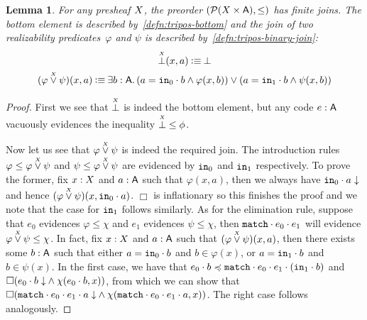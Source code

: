 \documentclass[11pt]{article}
\newtheorem{lemm}[thrm]{Lemma}
\begin{document}
\begin{lemm}\label{lemm:tripos-finite-joins}
  For any presheaf \(X\), the preorder \((\mathcal{P}{({X}\times{\ensuremath{\mathsf{A}}})}, \leq)\) has finite
  joins.
  The bottom element is described by~\ref{defn:tripos-bottom} and the join of two
  realizability predicates~\(\varphi\) and \(\psi\) is described
  by~\ref{defn:tripos-binary-join}:
  \begin{gather}
    \TBot{\X}(x,a)
    \IsDefined
    \IBot
    \label{defn:tripos-bottom}
    \\
    (\TOr{\varphi}{\psi}{\X})(x,a)
    \IsDefined
    \IExists{b:\A}{\IOr%
      {(\IAnd{\IEq{a}{\IAp{\ILeftCode}{b}}}{\varphi(x,b)})}%
      {(\IAnd{\IEq{a}{\IAp{\IRightCode}{b}}}{\psi(x,b)})}
    }
    \label{defn:tripos-binary-join}
  \end{gather}
\end{lemm}
\begin{proof}
  First we see that \(\overset{\scriptscriptstyle X}{\bot}\) is indeed the bottom element, but any code
  \(e : \mathsf{A}\) vacuously evidences the inequality \(\overset{\scriptscriptstyle X}{\bot} \leq \phi\).

  Now let us see that \({\varphi}\overset{\scriptscriptstyle X}{\lor}{\psi}\) is indeed the required join.
  The introduction rules \(\varphi\leq{\varphi}\overset{\scriptscriptstyle X}{\lor}{\psi}\) and
  \(\psi\leq{\varphi}\overset{\scriptscriptstyle X}{\lor}{\psi}\) are evidenced by \(\texttt{in}_0\) and
  \(\texttt{in}_1\) respectively.
  To prove the former, fix \(x:X\) and \(a:\mathsf{A}\) such that \(\varphi(x,a)\),
  then we always have \({{\texttt{in}_0}\cdot{a}}\downarrow\) and hence
  \(({\varphi}\overset{\scriptscriptstyle X}{\lor}{\psi})(x,{\texttt{in}_0}\cdot{a})\).
  \(\Box\) is inflationary so this finishes the proof and we note that the case
  for \(\texttt{in}_1\) follows similarly.
  As for the elimination rule, suppose that \(e_{0}\) evidences
  \(\varphi \leq \chi\) and \(e_{1}\) evidences \(\psi \leq \chi\), then
  \({{\texttt{match}}\cdot{e_{0}}}\cdot{e_{1}}\) will evidence
  \({\varphi}\overset{\scriptscriptstyle X}{\lor}{\psi} \leq \chi\).
  In fact, fix \(x:X\) and \(a:\mathsf{A}\) such that
  \(({\varphi}\overset{\scriptscriptstyle X}{\lor}{\psi})(x,a)\), then there exists some \(b:\mathsf{A}\) such that
  either \({a}={{\texttt{in}_0}\cdot{b}}\) and \(b\in\varphi(x)\), or
  \({a}={{\texttt{in}_1}\cdot{b}}\) and \(b\in\psi(x)\).
  In the first case, we have that
  \(\IPLeq%
  {\IAp{e_{0}}{b}}%
  {\IAp{\IAp{\IAp{\IMatchCode}{e_{0}}}{e_{1}}}{(\IAp{\IRightCode}{b})}}%
  \)
  and \(\Box{({{{e_{0}}\cdot{b}}\downarrow}\land{\chi({e_{0}}\cdot{b},x)})}\),
  from which we can show that
  \(\IBox{(\IAnd%
    {\ITotal{\IAp{\IAp{\IAp{\IMatchCode}{e_{0}}}{e_{1}}}{a}}}%
    {\chi(\IAp{\IAp{\IAp{\IMatchCode}{e_{0}}}{e_{1}}}{a},x)}%
  )}\).
  The right case follows analogously.
\end{proof}
\end{document}
